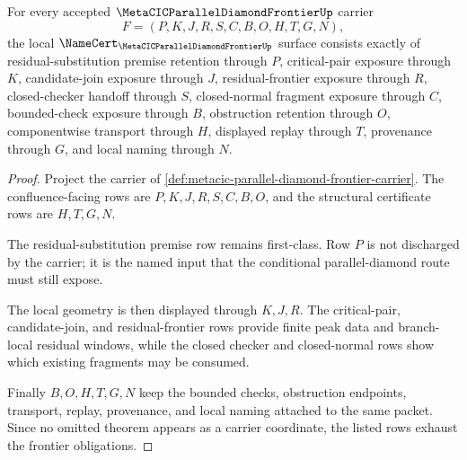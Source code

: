 \begin{theorem}
\label{thm:metacic-parallel-diamond-frontier-obligations}
For every accepted $\MetaCICParallelDiamondFrontierUp$ carrier
$$
F=(P,K,J,R,S,C,B,O,H,T,G,N),
$$
the local $\NameCert_{\MetaCICParallelDiamondFrontierUp}$ surface consists exactly of residual-substitution premise retention through $P$, critical-pair exposure through $K$, candidate-join exposure through $J$, residual-frontier exposure through $R$, closed-checker handoff through $S$, closed-normal fragment exposure through $C$, bounded-check exposure through $B$, obstruction retention through $O$, componentwise transport through $H$, displayed replay through $T$, provenance through $G$, and local naming through $N$.
\end{theorem}
\begin{proof}
Project the carrier of \autoref{def:metacic-parallel-diamond-frontier-carrier}. The confluence-facing rows are $P,K,J,R,S,C,B,O$, and the structural certificate rows are $H,T,G,N$.

The residual-substitution premise row remains first-class. Row $P$ is not discharged by the carrier; it is the named input that the conditional parallel-diamond route must still expose.

The local geometry is then displayed through $K,J,R$. The critical-pair, candidate-join, and residual-frontier rows provide finite peak data and branch-local residual windows, while the closed checker and closed-normal rows show which existing fragments may be consumed.

Finally $B,O,H,T,G,N$ keep the bounded checks, obstruction endpoints, transport, replay, provenance, and local naming attached to the same packet. Since no omitted theorem appears as a carrier coordinate, the listed rows exhaust the frontier obligations.
\end{proof}

